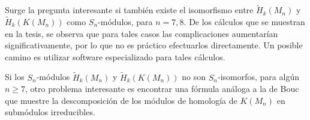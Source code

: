 \documentclass[12pt]{book}
\theoremstyle{definition}
\newcounter{in}
\begin{document}
Surge la pregunta interesante si también existe el isomorfismo entre
$\widetilde H_{k}(M_{n})$ y $\widetilde H_{k}(K(M_{n}))$ como
$S_{n}$-módulos, para $n=7,8$. De los cálculos que se muestran en la
tesis, se observa que para tales casos las complicaciones aumentarían
significativamente, por lo que no es práctico efectuarlos
directamente. Un posible camino es utilizar software especializado
para tales cálculos. 

Si los $S_{n}$-módulos $\widetilde H_{k}(M_{n})$ y $\widetilde
H_{k}(K(M_{n}))$ no son $S_{n}$-isomorfos, para algún $n\geq 7$, otro
problema interesante es encontrar una fórmula análoga a la de Bouc que
muestre la descomposición de los módulos de homología de $K(M_{n})$ en
submódulos irreducibles.






\printindex
\end{document}
